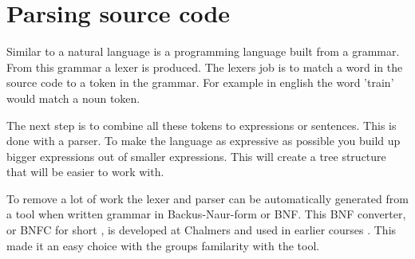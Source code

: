 \section{Parsing source code} \label{sec:bnfc}


Similar to a natural language is a programming language built from a grammar. 
From this grammar a lexer is produced. The lexers job is to match a word in the
source code to a token in the grammar. For example in english the word 'train' 
would match a noun token. 

The next step is to combine all these tokens to expressions or sentences. This
is done with a parser. To make the language as expressive as possible you build
up bigger expressions out of smaller expressions. This will create a tree
structure that will be easier to work with. 

To remove a lot of work the lexer and parser can be automatically generated from
a tool when written grammar in Backus-Naur-form or BNF. This BNF converter, or
BNFC for short , is developed at Chalmers and used in earlier courses .
This made it an easy choice with the groups familarity with the tool.


